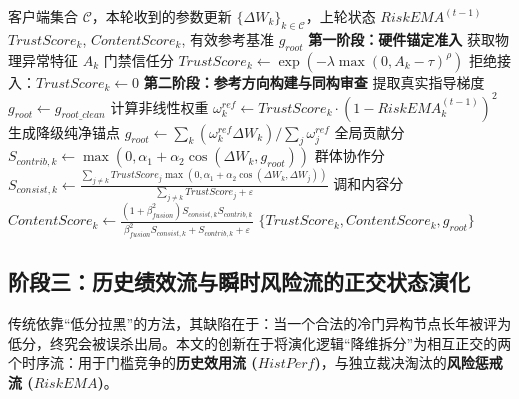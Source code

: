 \documentclass[11pt, a4paper, UTF8, fontset=fandol]{ctexart}
\begin{document}
\begin{algorithm}[htbp]
\caption{基于 TEE 硬件锚点与纯净参考的准入与内容审查}
\label{alg:phase12}
\begin{algorithmic}[1]
\REQUIRE 客户端集合 $\mathcal{C}$，本轮收到的参数更新 $\{\Delta W_k\}_{k\in\mathcal{C}}$，上轮状态 $RiskEMA^{(t-1)}$
\ENSURE $TrustScore_k$, $ContentScore_k$, 有效参考基准 $g_{root}$
\STATE \textbf{第一阶段：硬件锚定准入}
        \STATE 获取物理异常特征 $A_k$
        \STATE 门禁信任分 $TrustScore_k \leftarrow \exp(-\lambda \max(0, A_k-\tau)^\rho)$
    \ELSE
        \STATE 拒绝接入：$TrustScore_k \leftarrow 0$
    \ENDIF
\ENDFOR
\STATE \textbf{第二阶段：参考方向构建与同构审查}
    \STATE 提取真实指导梯度 $g_{root} \leftarrow g_{root\_clean}$
\ELSE
    \STATE 计算非线性权重 $\omega_k^{ref} \leftarrow TrustScore_k \cdot (1 - RiskEMA_k^{(t-1)})^2$
    \STATE 生成降级纯净锚点 $g_{root} \leftarrow \sum_k (\omega_k^{ref} \Delta W_k) / \sum_j \omega_j^{ref}$
\ENDIF
{}
    \STATE 全局贡献分 $S_{contrib,k} \leftarrow \max(0, \alpha_1 + \alpha_2 \cos(\Delta W_k, g_{root}))$
    \STATE 群体协作分 $S_{consist,k} \leftarrow \frac{\sum_{j \neq k} TrustScore_j \max(0, \alpha_1 + \alpha_2 \cos(\Delta W_k, \Delta W_j))}{\sum_{j \neq k} TrustScore_j + \varepsilon}$
    \STATE 调和内容分 $ContentScore_k \leftarrow \frac{(1+\beta_{fusion}^2)S_{consist,k} S_{contrib,k}}{\beta_{fusion}^2 S_{consist,k} + S_{contrib,k} + \varepsilon}$
\ENDFOR
\RETURN $\{TrustScore_k, ContentScore_k, g_{root}\}$
\end{algorithmic}
\end{algorithm}


\subsection{阶段三：历史绩效流与瞬时风险流的正交状态演化}
传统依靠“低分拉黑”的方法，其缺陷在于：当一个合法的冷门异构节点长年被评为低分，终究会被误杀出局。本文的创新在于将演化逻辑“降维拆分”为相互正交的两个时序流：用于门槛竞争的\textbf{历史效用流 ($HistPerf$)}，与独立裁决淘汰的\textbf{风险惩戒流 ($RiskEMA$)}。
\end{document}

